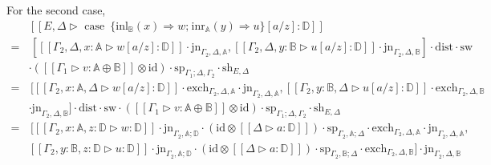   For the second case,
  \begin{equation*}
    \begin{split}
      &[\![E, \Delta \triangleright \text{ case }  \hspace{2pt}  \{\text{inl}_{\mathbb{B}} (x) \Rightarrow w ; \hspace{1pt} \text{inr}_{\mathbb{A}} (y) \Rightarrow u\} [a/z]: \mathbb{D}]\!] \\
      =& \hspace{2pt}  \left[[\![ \Gamma_2, \Delta, x:\mathbb{A} \triangleright w [a/z] : \mathbb{D}  ]\!] \cdot \text{jn}_{\Gamma_2, \Delta, \mathbb{A}} ,[\![ \Gamma_2, \Delta, y:\mathbb{B} \triangleright u [a/z] : \mathbb{D} ]\!]\cdot \text{jn}_{\Gamma_2, \Delta, \mathbb{B}}\right] \cdot \text{dist} \cdot \text{sw}   \\
      &  \cdot ([\![\Gamma_1 \triangleright v  : \mathbb{A} \oplus \mathbb{B}  ]\!] \otimes \text{id}) \cdot \text{sp}_{\Gamma_1; \Delta,\Gamma_2} \cdot \text{sh}_{E,\Delta} \\
      = & \hspace{2pt}[[\![ \Gamma_2,  x:\mathbb{A} , \Delta \triangleright w [a/z] : \mathbb{D}  ]\!] \cdot \text{exch}_{\Gamma_2,\Delta,\mathbb{A}} \cdot \text{jn}_{\Gamma_2, \Delta, \mathbb{A}},[\![ \Gamma_2,  y:\mathbb{B}, \Delta \triangleright u [a/z] :\mathbb{D}  ]\!] \cdot \text{exch}_{\Gamma_2, \Delta,\mathbb{B}}    \\
      & \cdot \text{jn}_{\Gamma_2, \Delta, \mathbb{B}} ]\cdot \text{dist} \cdot \text{sw} \cdot ([\![\Gamma_1 \triangleright v  : \mathbb{A} \oplus \mathbb{B}  ]\!] \otimes \text{id}) \cdot \text{sp}_{\Gamma_1; \Delta,\Gamma_2} \cdot \text{sh}_{E,\Delta} \\
      = & \hspace{2pt} [[\![ \Gamma_2, x:\mathbb{A},z:\mathbb{D} \triangleright w: \mathbb{D} ]\!]  \cdot \text{jn}_{\Gamma_2,\mathbb{A}; \mathbb{D}} \cdot (\text{id} \otimes [\![ \Delta \triangleright a:\mathbb{D}  ]\!] ) \cdot \text{sp}_{\Gamma_2,\mathbb{A};\Delta} \cdot  \text{exch}_{\Gamma_2, \Delta,\mathbb{A}} \cdot \text{jn}_{\Gamma_2, \Delta, \mathbb{A}} ,\\
      & [\![ \Gamma_2, y:\mathbb{B},z:\mathbb{D} \triangleright u : \mathbb{D}  ]\!]\cdot \text{jn}_{\Gamma_2,\mathbb{A}; \mathbb{D}} \cdot (\text{id} \otimes [\![ \Delta \triangleright a:\mathbb{D}  ]\!] ) \cdot \text{sp}_{\Gamma_2,\mathbb{B};\Delta} \cdot  \text{exch}_{\Gamma_2, \Delta,\mathbb{B}}]\cdot\text{jn}_{\Gamma_2, \Delta, \mathbb{B}}   \\

\end{split}
\end{equation*}
